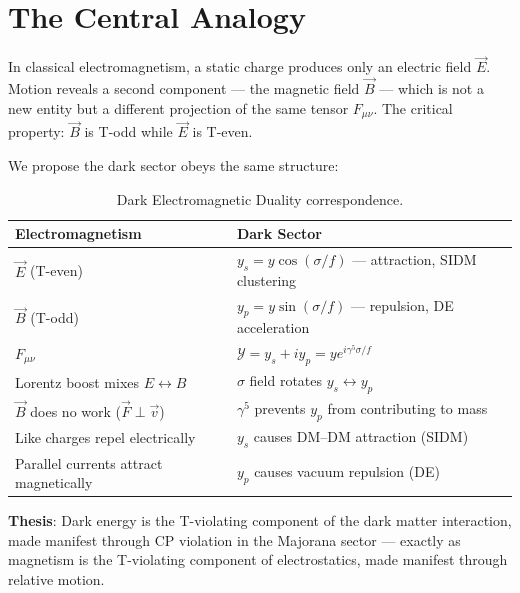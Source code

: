
\section{The Central Analogy}
\label{ch3:analogy}

In classical electromagnetism, a static charge produces only an electric field
$\vec{E}$. Motion reveals a second component — the magnetic field $\vec{B}$ —
which is not a new entity but a different projection of the same tensor $F_{\mu\nu}$.
The critical property: $\vec{B}$ is T-odd while $\vec{E}$ is T-even.

We propose the dark sector obeys the same structure:

\begin{table}[h!]
\centering
\caption{Dark Electromagnetic Duality correspondence.}
\begin{tabular}{ll}
\toprule
Electromagnetism & Dark Sector \\
\midrule
$\vec{E}$ (T-even) & $y_s = y\cos(\sigma/f)$ — attraction, SIDM clustering \\
$\vec{B}$ (T-odd) & $y_p = y\sin(\sigma/f)$ — repulsion, DE acceleration \\
$F_{\mu\nu}$ & $\mathcal{Y} = y_s + iy_p = ye^{i\gamma^5\sigma/f}$ \\
Lorentz boost mixes $E \leftrightarrow B$ & $\sigma$ field rotates $y_s \leftrightarrow y_p$ \\
$\vec{B}$ does no work ($\vec{F}\perp\vec{v}$) & $\gamma^5$ prevents $y_p$ from contributing to mass \\
Like charges repel electrically & $y_s$ causes DM–DM attraction (SIDM) \\
Parallel currents attract magnetically & $y_p$ causes vacuum repulsion (DE) \\
\bottomrule
\end{tabular}
\end{table}

\textbf{Thesis}: Dark energy is the T-violating component of the dark matter
interaction, made manifest through CP violation in the Majorana sector —
exactly as magnetism is the T-violating component of electrostatics,
made manifest through relative motion.

